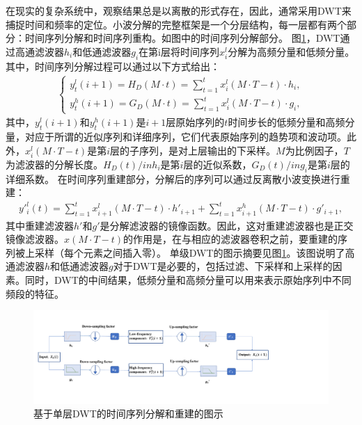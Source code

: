 在现实的复杂系统中，观察结果总是以离散的形式存在，因此，通常采用DWT来捕捉时间和频率的定位。小波分解的完整框架是一个分层结构，每一层都有两个部分：时间序列分解和时间序列重构。如图中的时间序列分解部分。
图\ref{figure2}，DWT通过高通滤波器$h_{i}$和低通滤波器$g_{i}$在第i层将时间序列$x^{l}_{i}$分解为高频分量和低频分量。其中，时间序列分解过程可以通过以下方式给出：
\begin{align}\label{DWT}
\begin{cases}
y^{l}_{t}(i+1)= H_{D}(M\cdot t) = \sum\limits_{t=1}^{t}x^{l}_{i}(M \cdot T -t)\cdot h_{i},\\[0.5em]
y^{h}_{t}(i+1)= G_{D}(M\cdot t) = \sum\limits_{t=1}^{t}x^{l}_{i}(M \cdot T -t)\cdot g_{i},
\end{cases}
\end{align}
其中，$y^{l}_{t}(i+1)$和$y^{h}_{t}(i+1)$是$i+1$层原始序列的$t$时间步长的低频分量和高频分量，对应于所谓的近似序列和详细序列\cite{3_21}，它们代表原始序列的趋势项和波动项。此外，$x^{l}_{i}(M\cdot T -t)$是第$i$层的子序列，是对上层输出的下采样。$M$为比例因子，$T$为滤波器的分解长度。$H_{D}(t)/in h_{i}$是第$i$层的近似系数，$G_{D}(t)/in g_{i}$是第$i$层的详细系数。
在时间序列重建部分，分解后的序列可以通过反离散小波变换进行重建：
\begin{align}\label{IDWT}
y'^{l}_{i}(t) = \sum_{t=1}^{t}x^{l}_{i+1}(M \cdot T -t)\cdot h'_{i+1}+
                \sum_{t=1}^{t}x^{h}_{i+1}(M \cdot T -t)\cdot g'_{i+1},
\end{align}
其中重建滤波器$h'$和$g'$是分解滤波器的镜像函数。因此，这对重建滤波器也是正交镜像滤波器。$x(M\cdot T -t)$的作用是，在与相应的滤波器卷积之前，要重建的序列被上采样（每个元素之间插入零）。
单级DWT的图示摘要见图\ref{figure2}。该图说明了高通滤波器$h$和低通滤波器$g$对于DWT是必要的，包括过滤、下采样和上采样的因素。同时，DWT的中间结果，低频分量和高频分量可以用来表示原始序列中不同频段的特征。
\begin{figure}[!htbp]
\begin{center}
\includegraphics[width=1\textwidth]{./ch3/fig3_2.pdf}
\caption{基于单层DWT的时间序列分解和重建的图示} \label{figure2}
\end{center}
\end{figure}


